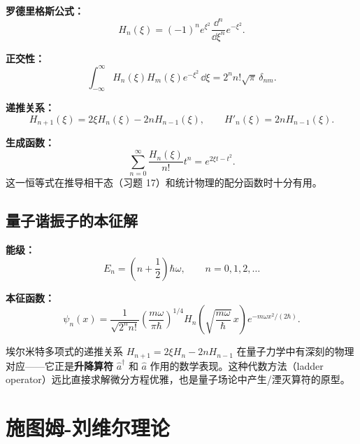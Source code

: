 \textbf{罗德里格斯公式：}
\begin{equation}
H_n(\xi) = (-1)^n e^{\xi^2}\frac{\dd^n}{\dd\xi^n}e^{-\xi^2}.
\label{eq:hermite_rodrigues}
\end{equation}

\textbf{正交性：}
\begin{equation}
\int_{-\infty}^{\infty} H_n(\xi)H_m(\xi)e^{-\xi^2}\,\dd\xi
= 2^n n!\sqrt{\pi}\,\delta_{nm}.
\label{eq:hermite_ortho}
\end{equation}

\textbf{递推关系：}
\begin{equation}
H_{n+1}(\xi) = 2\xi H_n(\xi) - 2n H_{n-1}(\xi),\qquad
H'_n(\xi) = 2n H_{n-1}(\xi).
\end{equation}

\textbf{生成函数：}
\begin{equation}
\sum_{n=0}^{\infty} \frac{H_n(\xi)}{n!}t^n = e^{2\xi t - t^2}.
\label{eq:hermite_genfunc}
\end{equation}
这一恒等式在推导相干态（习题 17）和统计物理的配分函数时十分有用。

\subsection{量子谐振子的本征解}

\textbf{能级：}
\begin{equation}
E_n = \left(n + \frac12\right)\hbar\omega,\qquad n=0,1,2,\dots
\end{equation}

\textbf{本征函数：}
\begin{equation}
\psi_n(x) = \frac{1}{\sqrt{2^n n!}}\left(\frac{m\omega}{\pi\hbar}\right)^{1/4}
H_n\!\left(\sqrt{\frac{m\omega}{\hbar}}\,x\right) e^{-m\omega x^2/(2\hbar)}.
\label{eq:harmonic_oscillator_wf}
\end{equation}

\begin{insight}
埃尔米特多项式的递推关系 $H_{n+1} = 2\xi H_n - 2n H_{n-1}$ 在量子力学中有深刻的物理对应——它正是\textbf{升降算符} $\hat{a}^\dagger$ 和 $\hat{a}$ 作用的数学表现。这种代数方法（ladder operator）远比直接求解微分方程优雅，也是量子场论中产生/湮灭算符的原型。
\end{insight}

\section{施图姆-刘维尔理论}
\label{sec:sturm_liouville}

